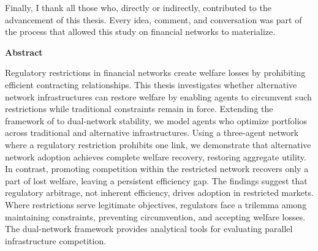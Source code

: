 Finally, I thank all those who, directly or indirectly, contributed to the advancement of this thesis. Every idea, comment, and conversation was part of the process that allowed this study on financial networks to materialize.





  \cleardoublepage
   
  \begin{center} \Large \textbf{Abstract} \end{center}

Regulatory restrictions in financial networks create welfare losses by prohibiting efficient contracting relationships. This thesis investigates whether alternative network infrastructures can restore welfare by enabling agents to circumvent such restrictions while traditional constraints remain in force. Extending the framework of  to dual-network stability, we model agents who optimize portfolios across traditional and alternative infrastructures. Using a three-agent network where a regulatory restriction prohibits one link, we demonstrate that alternative network adoption achieves complete welfare recovery, restoring aggregate utility. In contrast, promoting competition within the restricted network recovers only a part of lost welfare, leaving a persistent efficiency gap. The findings suggest that regulatory arbitrage, not inherent efficiency, drives adoption in restricted markets. Where restrictions serve legitimate objectives, regulators face a trilemma among maintaining constraints, preventing circumvention, and accepting welfare losses. The dual-network framework provides analytical tools for evaluating parallel infrastructure competition.





  \cleardoublepage
  \tableofcontents
  \cleardoublepage
  \listoffigures
  \cleardoublepage
  \listoftables
  \cleardoublepage

  \normalsize

